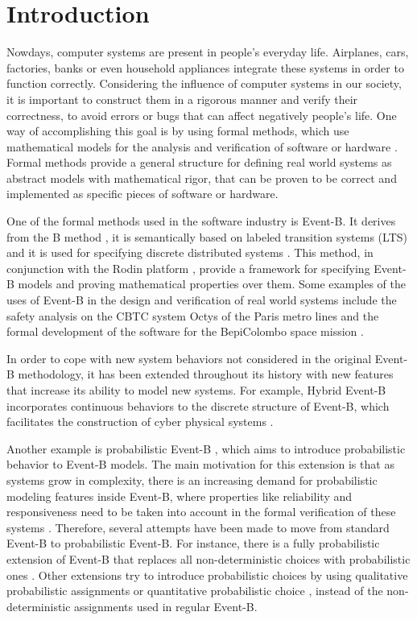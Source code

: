 \chapter{Introduction}
Nowdays, computer systems are present in people's everyday life. Airplanes, cars, factories, banks or even household appliances integrate these systems in order to function correctly. Considering the influence of computer systems in our society, it is important to construct them in a rigorous manner and verify their correctness, to avoid errors or bugs that can affect negatively people's life. One way of accomplishing this goal is by using formal methods, which use mathematical models for the analysis and verification of software or hardware \cite{Woodcock2009}. Formal methods provide a general structure for defining real world systems as abstract models with mathematical rigor, that can be proven to be correct and implemented as specific pieces of software or hardware.   

One of the formal methods used in the software industry is Event-B. It derives from the B method \cite{Abrial1996}, it is semantically based on labeled transition systems (LTS) \cite{LTS} and it is used for specifying discrete distributed systems \cite{Abrial2011}. This method, in conjunction with the Rodin platform \cite{Rodin}, provide a framework for specifying Event-B models and proving mathematical properties over them. Some examples of the uses of Event-B in the design and verification of real world systems include the safety analysis on the CBTC system Octys of the Paris metro lines \cite{Comptier2017} and the formal development of the software for the BepiColombo space mission \cite{Iliasov2010}. 

In order to cope with new system behaviors not considered in the original Event-B methodology, it has been extended throughout its history with new features that increase its ability to model new systems. For example, Hybrid Event-B incorporates continuous behaviors to the discrete structure of Event-B, which facilitates the construction of cyber physical systems \cite{Banach2015}.

Another example is probabilistic Event-B \cite{Morgan2005}, which aims to introduce probabilistic behavior to Event-B models. The main motivation for this extension is that as systems grow in complexity, there is an increasing demand for probabilistic modeling features inside Event-B, where properties like reliability and responsiveness need to be taken into account in the formal verification of these systems \cite{Aouadhi2017}. Therefore, several attempts have been made to move from standard Event-B to probabilistic Event-B. For instance, there is a fully probabilistic extension of Event-B that replaces all non-deterministic choices with probabilistic ones \cite{Aouadhi2017}. Other extensions try to introduce probabilistic choices by using qualitative probabilistic assignments \cite{Hallerstede2007} or quantitative probabilistic choice \cite{Tarasyuk2010}, instead of the non-deterministic assignments used in regular Event-B.

